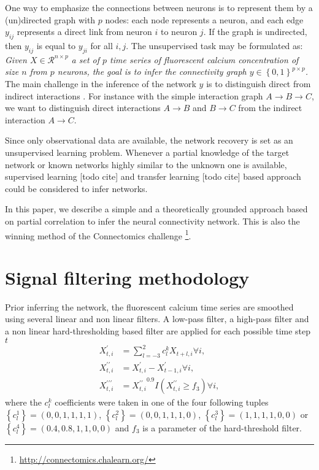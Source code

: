 \documentclass[wcp]{jmlr}
\begin{document}
One way to emphasize the connections between neurons is to represent them by a
(un)directed graph with $p$ nodes: each node represents a neuron, and each
edge $y_{ij}$ represents a direct link from neuron  $i$ to neuron $j$. If the
graph is undirected, then $y_{ij}$ is equal to $y_{ji}$  for all $i,j$.
The unsupervised task may be formulated as:
\textit{Given $X \in \mathcal{R}^{n \times p}$  a set of $p$ time series of
fluorescent calcium concentration of size $n$ from $p$ neurons, the goal is to
infer the connectivity graph $y \in \left\{0, 1\right\}^{p \times p}$.}
The main challenge in the inference of the network $y$
is to distinguish direct from indirect interactions \cite{de2004discovery}.
For instance with the simple interaction graph $A \rightarrow B \rightarrow C$,
we want to distinguish direct interactions $A \rightarrow B$ and $B \rightarrow C$
from the indirect interaction $A \rightarrow C$.

Since only observational data are available, the network recovery is set as an
unsupervised learning problem. Whenever a partial knowledge of the target
network or known networks highly similar to the unknown one is available,
supervised learning [todo cite] and transfer learning  [todo cite] based
approach could be considered to infer networks.

In this paper, we describe a simple and a theoretically grounded approach
based on partial correlation to infer the neural connectivity network.
This is also the winning method of the Connectomics challenge
\footnote{\url{http://connectomics.chalearn.org/}}.

\section{Signal filtering methodology}
\label{sec:filter}

Prior inferring the network, the fluorescent calcium time series are smoothed
using several linear and non linear filters. A low-pass filter, a high-pass
filter and a non linear hard-thresholding based filter are
applied for each possible time step $t$
\begin{align}
X^\prime_{t,i} &= \sum_{l=-3}^2 c_l^k X_{t+l,i} \forall i, \\
X^{\prime\prime}_{t,i} &= X^{\prime}_{t,i} - X^{\prime}_{t-1,i} \forall i, \\
X^{\prime\prime\prime}_{t,i} &= {X^{\prime\prime}_{t,i}}^{0.9} I(X^{\prime\prime}_{t,i} \geq f_3) \forall i,
\end{align}
where the $c_l^k$ coefficients were taken in one of the four following tuples
$\left\{c_l^1\right\}=(0, 0, 1, 1, 1, 1)$,
$\left\{c_l^2\right\}=(0, 0, 1, 1, 1, 0)$,
$\left\{c_l^3\right\}=(1, 1, 1, 1, 0, 0)$ or
$\left\{c_l^4\right\}=(0.4, 0.8, 1, 1, 0, 0)$ and $f_3$ is a parameter
of the hard-threshold filter.
\end{document}
